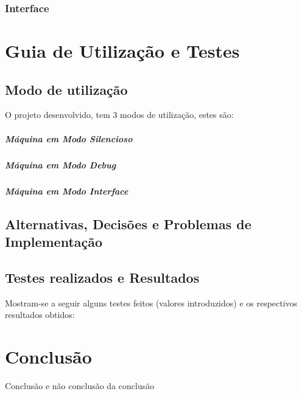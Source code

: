 \documentclass{report}
\begin{document}
\subsection{Interface}

\chapter{Guia de Utilização e Testes}
\section{Modo de utilização}
\quad O projeto desenvolvido, tem 3 modos de utilização, estes são:
\paragraph{\quad Máquina em Modo Silencioso}
\paragraph{\quad Máquina em Modo Debug}
\paragraph{\quad Máquina em Modo Interface}
\section{Alternativas, Decisões e Problemas de Implementação}
\section{Testes realizados e Resultados}
Mostram-se a seguir alguns testes feitos (valores introduzidos) e
os respectivos resultados obtidos:

\chapter{Conclusão} \label{concl}
Conclusão e não conclusão da conclusão



\end{document}
